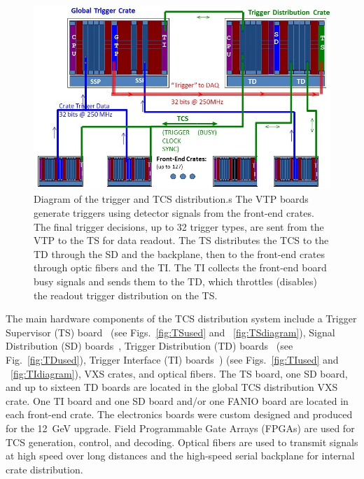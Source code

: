 \begin{figure}[hbt]
	\centering
	\includegraphics[width=1.0\columnwidth,keepaspectratio]{img/TCSdiagram.jpg}
	\caption{Diagram of the trigger and TCS distribution.s The VTP boards generate triggers using detector signals
          from the front-end crates.  The final trigger decisions, up to 32 trigger types, are sent from the VTP to the TS
          for data readout. The TS distributes the TCS to the TD through the SD and the backplane, then to the front-end
          crates through optic fibers and the TI.  The TI collects the front-end board busy signals and sends them to the TD,
          which throttles (disables) the readout trigger distribution on the TS.}
	\label{fig:TCSdiagram}
\end{figure}

The main hardware components of the TCS distribution system include a Trigger Supervisor (TS) board~\cite{ts-ref} 
(see Figs.~\ref{fig:TSused} and ~\ref{fig:TSdiagram}), Signal Distribution (SD) boards~\cite{sd-ref}, Trigger
Distribution (TD) boards~\cite{titd-ref} (see Fig.~\ref{fig:TDused}), Trigger Interface (TI) boards~\cite{titd-ref})
(see Figs.~\ref{fig:TIused} and ~\ref{fig:TIdiagram}), VXS crates, and optical fibers. The TS board, one SD board, and
up to sixteen TD boards are located in the global TCS distribution VXS crate.  One TI board and one SD board and/or
one FANIO board are located in each front-end crate. The electronics boards were custom designed and produced for
the 12~GeV upgrade. Field Programmable Gate Arrays (FPGAs) are used for TCS generation, control, and decoding.
Optical fibers are used to transmit signals at high speed over long distances and the high-speed serial backplane for
internal crate distribution.  

